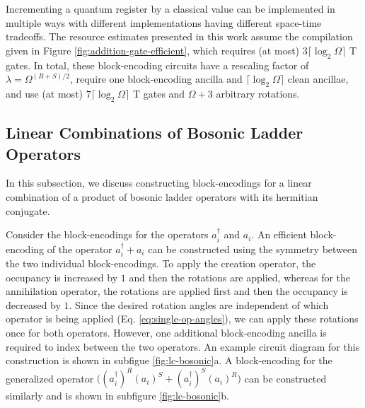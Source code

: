 Incrementing a quantum register by a classical value can be implemented in multiple ways with different implementations having different space-time tradeoffs.
The resource estimates presented in this work assume the compilation given in Figure \ref{fig:addition-gate-efficient}, which requires (at most) $3 \lceil \log_2 \Omega \rceil$ T gates.
In total, these block-encoding circuits have a rescaling factor of $\lambda = \Omega^{(R+S)/2}$, require one block-encoding ancilla and $\lceil{\log_2{\Omega}}\rceil$ clean ancillae, and use (at most) $7 \lceil \log_2 \Omega \rceil$ T gates and $\Omega + 3$ arbitrary rotations.


\subsection{Linear Combinations of Bosonic Ladder Operators}

In this subsection, we discuss constructing block-encodings for a linear combination of a product of bosonic ladder operators with its hermitian conjugate.


\begin{figure*}
    
    
    \caption{
        \textbf{Block-Encoding Product of Bosonic Ladder Operators Plus Hermitian Conjugate}
        In (a), a block-encoding for the operator $(a_i^\dagger + a_i)$ is given.
        In (b), a block-encoding for the operator $\big((a_i^\dagger)^R (a_i)^S + (a_i^\dagger)^S (a_i)^R\big)$ is given.
    }
    \label{fig:lc-bosonic}
\end{figure*}


Consider the block-encodings for the operators $a_i^\dagger$ and $a_i$.
An efficient block-encoding of the operator $a_i^\dagger + a_i$ can be constructed using the symmetry between the two individual block-encodings. 
To apply the creation operator, the occupancy is increased by $1$ and then the rotations are applied, whereas for the annihilation operator, the rotations are applied first and then the occupancy is decreased by $1$.
Since the desired rotation angles are independent of which operator is being applied (Eq. \ref{eq:single-op-angles}), we can apply these rotations once for both operators.
However, one additional block-encoding ancilla is required to index between the two operators.
An example circuit diagram for this construction is shown in subfigue \ref{fig:lc-bosonic}a.
A block-encoding for the generalized operator $\big((a_i^\dagger)^R (a_i)^S + (a_i^\dagger)^S (a_i)^R\big)$ can be constructed similarly and is shown in subfigure \ref{fig:lc-bosonic}b.

